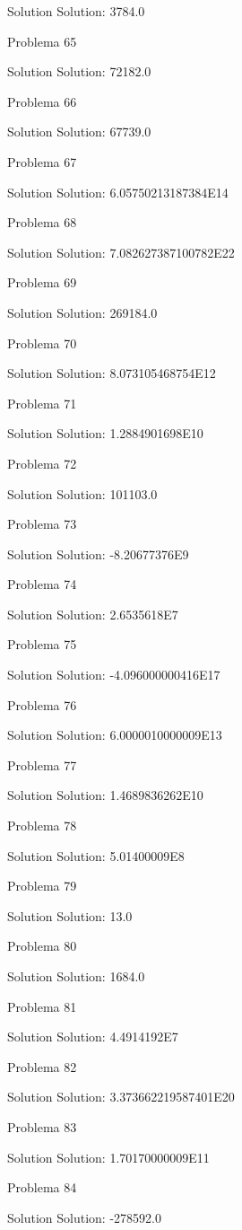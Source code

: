\documentclass{article}
\begin{document}
Solution Solution: 3784.0

Problema 65

Solution Solution: 72182.0

Problema 66

Solution Solution: 67739.0

Problema 67

Solution Solution: 6.05750213187384E14

Problema 68

Solution Solution: 7.082627387100782E22

Problema 69

Solution Solution: 269184.0

Problema 70

Solution Solution: 8.073105468754E12

Problema 71

Solution Solution: 1.2884901698E10

Problema 72

Solution Solution: 101103.0

Problema 73

Solution Solution: -8.20677376E9

Problema 74

Solution Solution: 2.6535618E7

Problema 75

Solution Solution: -4.096000000416E17

Problema 76

Solution Solution: 6.0000010000009E13

Problema 77

Solution Solution: 1.4689836262E10

Problema 78

Solution Solution: 5.01400009E8

Problema 79

Solution Solution: 13.0

Problema 80

Solution Solution: 1684.0

Problema 81

Solution Solution: 4.4914192E7

Problema 82

Solution Solution: 3.373662219587401E20

Problema 83

Solution Solution: 1.70170000009E11

Problema 84

Solution Solution: -278592.0
\end{document}
